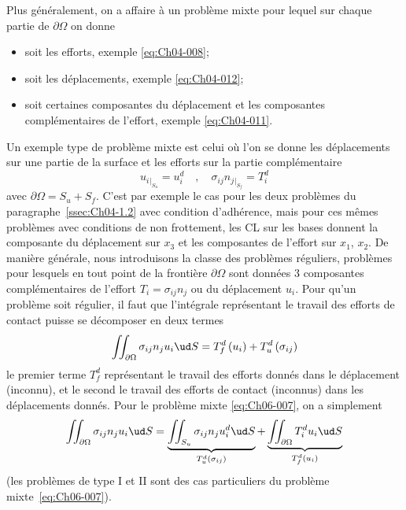 Plus généralement, on a affaire à un problème mixte pour lequel sur chaque partie de $\partial \Omega$ on donne
\begin{itemize}
    \item soit les efforts, exemple \eqref{eq:Ch04-008}; 
    \item soit les déplacements, exemple \eqref{eq:Ch04-012};
    \item soit certaines composantes du déplacement et les composantes complémentaires de l'effort, exemple \eqref{eq:Ch04-011}.
\end{itemize}

Un exemple type de problème mixte est celui où l'on se donne les déplacements sur une partie de la surface et les efforts sur la partie complémentaire
\begin{equation}
    u_i{}_{|_{S_u}} =  u_i^d \quad, \quad \sigma_{ij} n_j{}_{|_{S_f}} = T_i^d
    \label{eq:Ch06-007}
\end{equation}
avec $\partial \Omega = S_u + S_f$.
C'est par exemple le cas pour les deux problèmes du paragraphe~\ref{ssec:Ch04-1.2} avec condition d'adhérence, mais pour ces mêmes problèmes avec conditions de non frottement, les CL sur les bases donnent la composante du déplacement sur $x_3$ et les composantes de l'effort sur $x_1$, $x_2$.
De manière générale, nous introduisons la classe des problèmes réguliers, problèmes pour lesquels en tout point de la frontière $\partial \Omega$ sont données 3 composantes complémentaires de l'effort $T_i = \sigma_{ij} n_j$ ou du déplacement $u_i$.
Pour qu'un problème soit régulier, il faut que l'intégrale représentant le travail des efforts de contact puisse se décomposer en deux termes
\begin{equation}
    \iint_{\partial \Omega} \sigma_{ij} n_j u_i \ud S = T_f^d \left( u_i \right) + T_u^d \left( \sigma_{ij} \right)
    \label{eq:Ch06-008}
\end{equation}
le premier terme $T_f^d$ représentant le travail des efforts donnés dans le déplacement (inconnu), et le second le travail des efforts de contact (inconnus) dans les déplacements donnés.
Pour le problème mixte \eqref{eq:Ch06-007}, on a simplement
\begin{equation}
    \iint_{\partial \Omega} \sigma_{ij} n_j u_i \ud S = \underbrace{\iint_{S_u} \sigma_{ij} n_j u_i^d \ud S}_{T_u^d\left( \sigma_{ij} \right)} +  \underbrace{\iint_{\partial \Omega} T_i^d u_i \ud S}_{T_f^d\left( u_i \right)}
    \label{eq:Ch06-009}
\end{equation}
(les problèmes de type I et II sont des cas particuliers du problème mixte~\eqref{eq:Ch06-007}).
